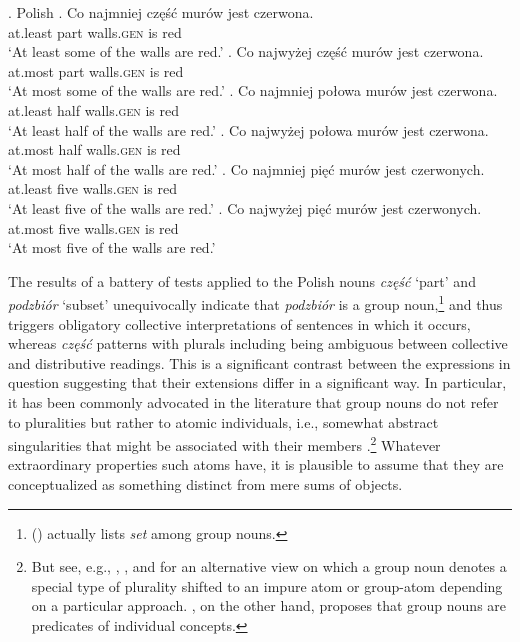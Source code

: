 \ex.\label{ex:partitives-polish-modifiers} Polish
\ag. {Co najmniej} część murów jest czerwona.\label{ex:explicit-partitives-polish-at-least} \\
at.least part walls\textsc{.gen} is red\\
`At least some of the walls are red.'
\bg. {Co najwyżej} część murów jest czerwona.\label{ex:explicit-partitives-polish-at-most} \\
at.most part walls\textsc{.gen} is red\\
`At most some of the walls are red.'
\bg. {Co najmniej} połowa murów jest czerwona.\label{ex:proportional-partitives-polish-at-least} \\
at.least half walls\textsc{.gen} is red\\
`At least half of the walls are red.'
\bg. {Co najwyżej} połowa murów jest czerwona.\label{ex:proportional-partitives-polish-at-most} \\
at.most half walls\textsc{.gen} is red\\
`At most half of the walls are red.'
\bg. {Co najmniej} pięć murów jest czerwonych.\label{ex:count-partitives-polish-at-least} \\
at.least five walls\textsc{.gen} is red\\
`At least five of the walls are red.'
\bg. {Co najwyżej} pięć murów jest czerwonych.\label{ex:count-partitives-polish-at-most} \\
at.most five walls\textsc{.gen} is red\\
`At most five of the walls are red.'

The results of a battery of tests applied to the Polish nouns \textit{część} `part' and \textit{podzbiór} `subset' unequivocally indicate that \textit{podzbiór} is a group noun,\footnote{\citeauthor{schwarzschild1996pluralities} (\citeyear[p. 168]{schwarzschild1996pluralities}) actually lists \textit{set} among group nouns.} and thus triggers obligatory collective interpretations of sentences in which it occurs, whereas \textit{część} patterns with plurals including being ambiguous between collective and distributive readings. This is a significant contrast between the expressions in question suggesting that their extensions differ in a significant way. In particular, it has been commonly advocated in the literature that group nouns do not refer to pluralities but rather to atomic individuals, i.e., somewhat abstract singularities that might be associated with their members \citep[e.g.,][]{barker1992group,schwarzschild1996pluralities,winter2001flexibility,champollion2017parts}.\footnote{But see, e.g., \citet{link1984hydras,link1998algebraic}, \citet{landman1989groupsi,landman1989groupsii,landman2000events}, and \citet{de_vries2015shifting} for an alternative view on which a group noun denotes a special type of plurality shifted to an impure atom or group-atom depending on a particular approach. \citet{pearson2011new}, on the other hand, proposes that group nouns are predicates of individual concepts.} Whatever extraordinary properties such atoms have, it is plausible to assume that they are conceptualized as something distinct from mere sums of objects.

